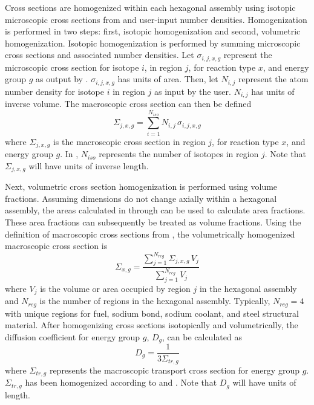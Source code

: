   Cross sections are homogenized within each hexagonal assembly using isotopic
  microscopic cross sections from \mcc and user-input number densities.
  Homogenization is performed in two steps: first, isotopic homogenization and
  second, volumetric homogenization. Isotopic homogenization is performed by
  summing microscopic cross sections and associated number densities. Let
  $\sigma_{i,j,x,g}$ represent the microscopic cross section for isotope $i$, in
  region $j$, for reaction type $x$, and energy group $g$ as output by \mcc.
  $\sigma_{i,j,x,g}$ has units of area. Then, let $N_{i,j}$ represent the atom
  number density for isotope $i$ in region $j$ as input by the user. $N_{i,j}$
  has units of inverse volume. The macroscopic cross section can then be
  defined
  \begin{equation}
    \label{eq:isotopic_homogenization}
    \Sigma_{j,x,g} = \sum_{i=1}^{N_{iso}} N_{i,j} \, \sigma_{i,j,x,g}
  \end{equation}
  where $\Sigma_{j,x,g}$ is the macroscopic cross section in region $j$, for
  reaction type $x$, and energy group $g$. In ,
  $N_{iso}$ represents the number of isotopes in region $j$. Note that
  $\Sigma_{j,x,g}$ will have units of inverse length.

  Next, volumetric cross section homogenization is performed using volume
  fractions. Assuming dimensions do not change axially within a hexagonal
  assembly, the areas calculated in  through
   can be used to calculate area fractions.
  These area fractions can subsequently be treated as volume fractions.
  Using the definition of macroscopic cross sections from
  , the volumetrically homogenized macroscopic
  cross section is 
  \begin{equation}
    \label{eq:volumetric_homogenization}
    \Sigma_{x,g} = \frac{\sum_{j = 1}^{N_{reg}} \Sigma_{j,x,g} \, V_j}
      {\sum_{j=1}^{N_{reg}} V_j}
  \end{equation}
  where $V_j$ is the volume or area occupied by region $j$ in the hexagonal
  assembly and $N_{reg}$ is the number of regions in the hexagonal assembly.
  Typically, $N_{reg} = 4$ with unique regions for fuel, sodium bond, sodium
  coolant, and steel structural material. After homogenizing cross sections
  isotopically and volumetrically, the diffusion coefficient for energy group
  $g$, $D_g$, can be calculated as 
  \begin{equation}
    \label{eq:diffusion_homogenization}
    D_g = \frac{1}{3 \Sigma_{tr,g}}
  \end{equation}
  where $\Sigma_{tr,g}$ represents the macroscopic transport cross section for
  energy group $g$. $\Sigma_{tr,g}$ has been homogenized according to
   and .
  Note that $D_g$ will have units of length.

